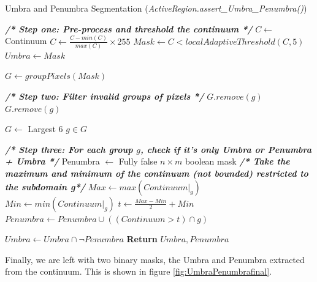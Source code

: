 \documentclass[defaultstyle,11pt]{thesis}
\begin{document}
\begin{algorithm}
\caption{Umbra and Penumbra Segmentation (\textit{ActiveRegion.assert\_Umbra\_Penumbra()}) }\label{alg:umpum}

\begin{algorithmic}[1]
    \State
    \State \textbf{\textit{/* Step one: Pre-process and threshold the continuum */}}
    \State $C \gets$ Continuum
    \State $C \gets \frac{C - min(C)}{max(C)} \times 255$ 
    \State $Mask \gets C < localAdaptiveThreshold(C, 5)$  
    \State $Umbra \gets Mask$ 
    
    \State
    \State $G \gets groupPixels(Mask)$ 
    
    \State 
    \State \textbf{\textit{/* Step two: Filter invalid groups of pixels */}}
            \State $G.remove(g)$
        \EndIf
            \State $G.remove(g)$
        \EndIf
    \EndFor
   
    \State $G \gets $ Largest 6 $g \in G$ 
    
    \State
    \State \textbf{\textit{/* Step three: For each group $g$, check if it's only Umbra or Penumbra + Umbra */}}
    \State Penumbra $\gets$ Fully false $n \times m$ boolean mask
    \State 
        \State
        \State \textbf{\textit{/* Take the maximum and minimum of the continuum (not bounded) restricted to the subdomain g*/}}
        \State $Max \gets max(Continuum|_g)$ 
        \State $Min \gets min(Continuum|_g)$
        \State 
         
            \State $t \gets \frac{Max - Min}{2} + Min$
            \State $Penumbra \gets Penumbra \cup ((Continuum > t) \cap g)$
        \EndIf
    \EndFor
    
    \State
    \State $Umbra \gets Umbra \cap \neg Penumbra$
    \State \textbf{Return} $Umbra, Penumbra$ 
\end{algorithmic}
\end{algorithm}


Finally, we are left with two binary masks, the Umbra and Penumbra extracted from the continuum. This is shown in figure \ref{fig:UmbraPenumbrafinal}.
\end{document}
